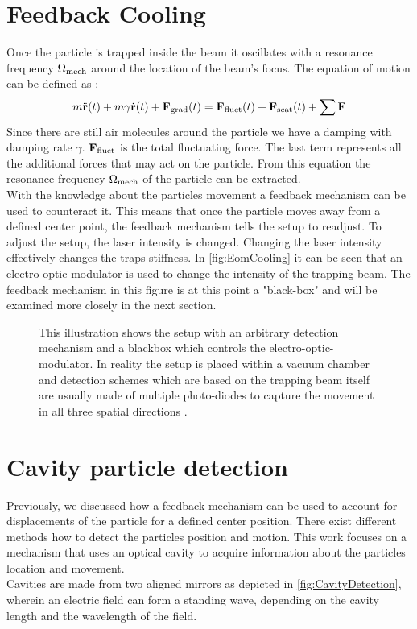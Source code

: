 \section{Feedback Cooling}
Once the particle is trapped inside the beam it oscillates with a resonance frequency $\de{\Omega}{mech}$ around the location of the beam's focus. The equation of motion can be defined as \cite[p.~24]{hebestreit2017thermal}:
\begin{equation}
	m\ddot{\vc{r}}(t)+m\gamma\dot{\vc{r}}(t)+\field{F}{grad}(t)=\field{F}{fluct}(t)+\field{F}{scat}(t)+\sum\limits\vc{F}
\end{equation}
Since there are still air molecules around the particle we have a damping with damping rate $\gamma$. $\field{F}{fluct}$ is the total fluctuating force. The last term represents all the additional forces that may act on the particle. From this equation the resonance frequency $\de{\Omega}{mech}$ of the particle can be extracted.\\
With the knowledge about the particles movement a feedback mechanism can be used to counteract it. This means that once the particle moves away from a defined center point, the feedback mechanism tells the setup to readjust. To adjust the setup, the laser intensity is changed. Changing the laser intensity effectively changes the traps stiffness. In \autoref{fig:EomCooling} it can be seen that an electro-optic-modulator is used to change the intensity of the trapping beam. The feedback mechanism in this figure is at this point a "black-box" and will be examined more closely in the next section.
\begin{figure}[H]
    
    \caption{This illustration shows the setup with an arbitrary detection mechanism and a blackbox which controls the electro-optic-modulator. In reality the setup is placed within a vacuum chamber and detection schemes which are based on the trapping beam itself are usually made of multiple photo-diodes to capture the movement in all three spatial directions \cite[p.~43]{hebestreit2017thermal}.}
    \label{fig:EomCooling}
\end{figure}

\section{Cavity particle detection}\label{ChapCavityDetection}
Previously, we discussed how a feedback mechanism can be used to account for displacements of the particle for a defined center position. There exist different methods how to detect the particles position and motion. This work focuses on a mechanism that uses an optical cavity to acquire information about the particles location and movement.\\
Cavities are made from two aligned mirrors as depicted in \autoref{fig:CavityDetection}, wherein an electric field can form a standing wave, depending on the cavity length and the wavelength of the field.

